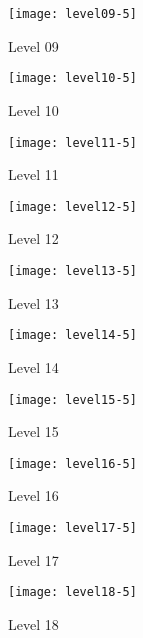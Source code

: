 \begin{figure}
  \centering
  \texttt{[image: level09-5]}
  \caption{Level 09}
  \label{fig:level09-stats}
\end{figure}
 
\begin{figure}
  \centering
  \texttt{[image: level10-5]}
  \caption{Level 10}
  \label{fig:level10-stats}
\end{figure}

\clearpage

\begin{figure}
  \centering
  \texttt{[image: level11-5]}
  \caption{Level 11}
  \label{fig:level11-stats}
\end{figure}
 
\begin{figure}
  \centering
  \texttt{[image: level12-5]}
  \caption{Level 12}
  \label{fig:level12-stats}
\end{figure}

\begin{figure}
  \centering
  \texttt{[image: level13-5]}
  \caption{Level 13}
  \label{fig:level13-stats}
\end{figure}

\begin{figure}
  \centering
  \texttt{[image: level14-5]}
  \caption{Level 14}
  \label{fig:level14-stats}
\end{figure}
 
\begin{figure}
  \centering
  \texttt{[image: level15-5]}
  \caption{Level 15}
  \label{fig:level15-stats}
\end{figure}

\begin{figure}
  \centering
  \texttt{[image: level16-5]}
  \caption{Level 16}
  \label{fig:level16-stats}
\end{figure}
 
\begin{figure}
  \centering
  \texttt{[image: level17-5]}
  \caption{Level 17}
  \label{fig:level17-stats}
\end{figure}

\begin{figure}
  \centering
  \texttt{[image: level18-5]}
  \caption{Level 18}
  \label{fig:level18-stats}
\end{figure}
 

